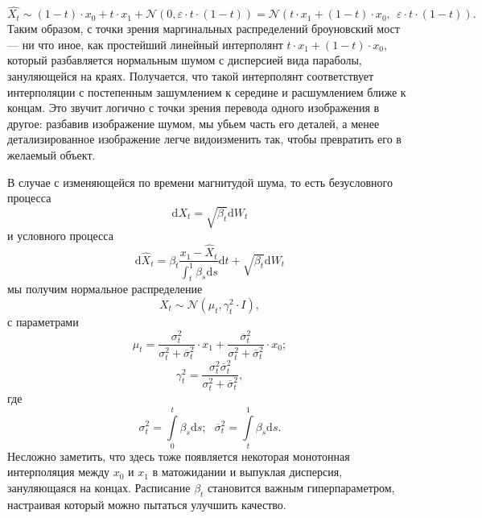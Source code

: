 \documentclass[12pt]{article}
\theoremstyle{definition}
\begin{document}
\[
    \hat{X_t} \sim (1 - t)\cdot x_0 + t \cdot x_1 + \mathcal{N}(0, \varepsilon \cdot t \cdot (1 - t)) = \mathcal{N}\left(t \cdot x_1 + (1 - t) \cdot x_0,\:\: \varepsilon \cdot t \cdot (1 - t)\right).
\]
Таким образом, с точки зрения маргинальных распределений броуновский мост --- ни что иное, как простейший линейный интерполянт $t \cdot x_1 + (1 - t) \cdot x_0$, который разбавляется нормальным шумом с дисперсией вида параболы, зануляющейся на краях. Получается, что такой интерполянт соответствует интерполяции с постепенным зашумлением к середине и расшумлением ближе к концам. Это звучит логично с точки зрения перевода одного изображения в другое: разбавив изображение шумом, мы убьем часть его деталей, а менее детализированное изображение легче видоизменить так, чтобы превратить его в желаемый объект.

В случае с изменяющейся по времени магнитудой шума, то есть безусловного процесса
\[
    \mathrm{d} X_t = \sqrt{\beta_t} \mathrm{d} W_t
\]
и условного процесса
\[
    \mathrm{d} \hat{X}_t = \beta_t \frac{x_1 - \hat{X}_t}{\int_{t}^{1} \beta_s \mathrm{d} s} \mathrm{d} t + \sqrt{\beta_t} \mathrm{d} W_t
\]
мы получим нормальное распределение
\[
    X_t \sim \mathcal{N}\left(\mu_t, \gamma^2_t \cdot I\right),
\]
с параметрами
\[
    \mu_t = \frac{\sigma^2_t}{\sigma^2_t + \overline{\sigma}^2_t} \cdot x_1 + \frac{\overline{\sigma}^2_t}{\sigma^2_t + \overline{\sigma}^2_t} \cdot x_0;
\]
\[
    \gamma^2_t = \frac{\sigma^2_t \overline{\sigma}^2_t}{\sigma^2_t + \overline{\sigma}^2_t},
\]
где
\[
    \sigma^2_t = \int\limits_{0}^{t} \beta_s \mathrm{d} s; \:\:\: \overline{\sigma}^2_t = \int\limits_{t}^{1} \beta_s \mathrm{d} s.
\]
Несложно заметить, что здесь тоже появляется некоторая монотонная интерполяция между $x_0$ и $x_1$ в матожидании и выпуклая дисперсия, зануляющаяся на концах. Расписание $\beta_t$ становится важным гиперпараметром, настраивая который можно пытаться улучшить качество.
\end{document}

